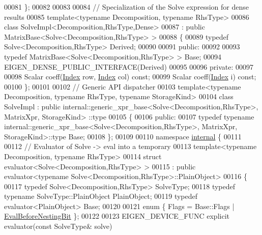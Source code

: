 \begin{DoxyCode}
00081 \};
00082 
00083 
00084 \textcolor{comment}{// Specialization of the Solve expression for dense results}
00085 \textcolor{keyword}{template}<\textcolor{keyword}{typename} Decomposition, \textcolor{keyword}{typename} RhsType>
00086 \textcolor{keyword}{class }SolveImpl<Decomposition,RhsType,Dense>
00087   : \textcolor{keyword}{public} MatrixBase<Solve<Decomposition,RhsType> >
00088 \{
00089   \textcolor{keyword}{typedef} Solve<Decomposition,RhsType> Derived;
00090   
00091 \textcolor{keyword}{public}:
00092   
00093   \textcolor{keyword}{typedef} MatrixBase<Solve<Decomposition,RhsType> > Base;
00094   EIGEN\_DENSE\_PUBLIC\_INTERFACE(Derived)
00095 
00096 \textcolor{keyword}{private}:
00097   
00098   Scalar coeff(\hyperlink{namespace_eigen_a62e77e0933482dafde8fe197d9a2cfde}{Index} row, \hyperlink{namespace_eigen_a62e77e0933482dafde8fe197d9a2cfde}{Index} col) \textcolor{keyword}{const};
00099   Scalar coeff(\hyperlink{namespace_eigen_a62e77e0933482dafde8fe197d9a2cfde}{Index} i) \textcolor{keyword}{const};
00100 \};
00101 
00102 \textcolor{comment}{// Generic API dispatcher}
00103 \textcolor{keyword}{template}<\textcolor{keyword}{typename} Decomposition, \textcolor{keyword}{typename} RhsType, \textcolor{keyword}{typename} StorageKind>
00104 \textcolor{keyword}{class }SolveImpl : \textcolor{keyword}{public} internal::generic\_xpr\_base<Solve<Decomposition,RhsType>, MatrixXpr, StorageKind>
      ::type
00105 \{
00106   \textcolor{keyword}{public}:
00107     \textcolor{keyword}{typedef} \textcolor{keyword}{typename} internal::generic\_xpr\_base<Solve<Decomposition,RhsType>, MatrixXpr, StorageKind>::type
       Base;
00108 \};
00109 
00110 \textcolor{keyword}{namespace }\hyperlink{namespaceinternal}{internal} \{
00111 
00112 \textcolor{comment}{// Evaluator of Solve -> eval into a temporary}
00113 \textcolor{keyword}{template}<\textcolor{keyword}{typename} Decomposition, \textcolor{keyword}{typename} RhsType>
00114 \textcolor{keyword}{struct }evaluator<Solve<Decomposition,RhsType> >
00115   : \textcolor{keyword}{public} evaluator<typename Solve<Decomposition,RhsType>::PlainObject>
00116 \{
00117   \textcolor{keyword}{typedef} Solve<Decomposition,RhsType> SolveType;
00118   \textcolor{keyword}{typedef} \textcolor{keyword}{typename} SolveType::PlainObject PlainObject;
00119   \textcolor{keyword}{typedef} evaluator<PlainObject> Base;
00120 
00121   \textcolor{keyword}{enum} \{ Flags = Base::Flags | \hyperlink{group__flags_gaa34e83bae46a8eeae4e69ebe3aaecbed}{EvalBeforeNestingBit} \};
00122   
00123   EIGEN\_DEVICE\_FUNC \textcolor{keyword}{explicit} evaluator(\textcolor{keyword}{const} SolveType& solve)

\end{DoxyCode}
